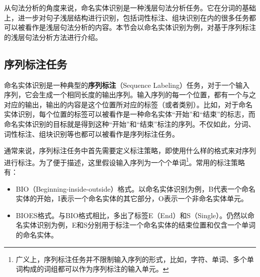 \parinterval 从句法分析的角度来说，命名实体识别是一种浅层句法分析任务。它在分词的基础上，进一步对句子浅层结构进行识别，包括词性标注、组块识别在内的很多任务都可以被看作是浅层句法分析的内容。本节会以命名实体识别为例，对基于序列标注的浅层句法分析方法进行介绍。


\subsection{序列标注任务}

\parinterval 命名实体识别是一种典型的{\small\sffamily\bfseries{序列标注}}（Sequence Labeling）任务，对于一个输入序列，它会生成一个相同长度的输出序列。输入序列的每一个位置，都有一个与之对应的输出，输出的内容是这个位置所对应的标签（或者类别）。比如，对于命名实体识别，每个位置的标签可以被看作是一种命名实体“开始”和“结束”的标志，而命名实体识别的目标就是得到这种“开始”和“结束”标注的序列。不仅如此，分词、词性标注、组块识别等也都可以被看作是序列标注任务。

\parinterval 通常来说，序列标注任务中首先需要定义标注策略，即使用什么样的格式来对序列进行标注。为了便于描述，这里假设输入序列为一个个单词\footnote{广义上，序列标注任务并不限制输入序列的形式，比如，字符、单词、多个单词构成的词组都可以作为序列标注的输入单元。}。常用的标注策略有：

\begin{itemize}
\vspace{0.5em}
\item BIO（Beginning-inside-outside）格式。以命名实体识别为例，B代表一个命名实体的开始，I表示一个命名实体的其它部分，O表示一个非命名实体单元。
\vspace{0.5em}
\item BIOES格式。与BIO格式相比，多出了标签E（End）和S（Single）。仍然以命名实体识别为例，E和S分别用于标注一个命名实体的结束位置和仅含一个单词的命名实体。
\vspace{0.5em}
\end{itemize}

